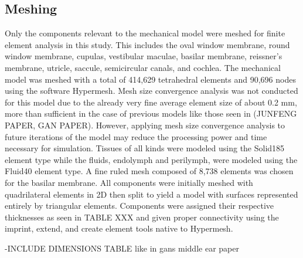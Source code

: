 \documentclass[12pt]{article}
\begin{document}
\subsection{Meshing}
Only the components relevant to the mechanical model were meshed for finite element analysis in this study. This includes the oval window membrane, round window membrane, cupulas, vestibular maculae, basilar membrane, reissner's membrane, utricle, saccule, semicircular canals, and cochlea. The mechanical model was meshed with a total of 414,629 tetrahedral elements and 90,696 nodes using the software Hypermesh. Mesh size convergence analysis was not conducted for this model due to the already very fine average element size of about 0.2 mm, more than sufficient in the case of previous models like those seen in (JUNFENG PAPER, GAN PAPER). However, applying mesh size convergence analysis to future iterations of the model may reduce the processing power and time necessary for simulation. Tissues of all kinds were modeled using the Solid185 element type while the fluids, endolymph and perilymph, were modeled using the Fluid40 element type. A fine ruled mesh composed of 8,738 elements was chosen for the basilar membrane. All components were initially meshed with quadrilateral elements in 2D then split to yield a model with surfaces represented entirely by triangular elements. Components were assigned their respective thicknesses as seen in TABLE XXX and given proper connectivity using the imprint, extend, and create element tools native to Hypermesh. 

-INCLUDE DIMENSIONS TABLE like in gans middle ear paper
\end{document}
